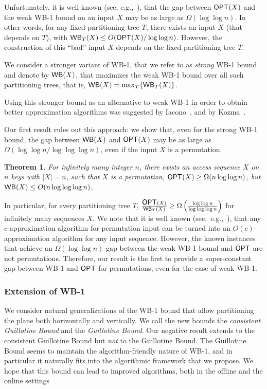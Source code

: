 \documentclass[11pt]{article}
\numberwithin{equation}{section}
\newtheorem{theorem}{Theorem}[section]
\theoremstyle{definition}
\theoremstyle{plain}
\begin{document}
Unfortunately, it is well-known (see, e.g.,~\cite{tango,multisplay,in_pursuit}), that the gap between $\mbox{\sf OPT}(X)$
and the weak WB-1 bound on an input $X$ may be as large as  $\Omega(\log\log n)$. 
In other words, for any fixed partitioning tree $T$, there exists an input $X$ (that depends on $T$),  with $\mathsf{WB}_{T}(X)\leq O(\mbox{\sf OPT}(X)/\log\log n)$.
However, the construction of this ``bad'' input $X$  depends on the fixed partitioning tree $T$. 


We consider a stronger variant of WB-1, that we refer to as \emph{strong} WB-1 bound and denote by $\mathsf{WB}(X)$, that maximizes the weak WB-1 bound over all such partitioning trees, that is, $\mathsf{WB}(X)=\max_{T}\{\mathsf{WB}_{T}(X)\}$. 


Using this stronger bound as an alternative to weak WB-1 in order to obtain better approximation algorithms was suggested by Iacono~\cite{in_pursuit}, and by Kozma~\cite{Kozma16_thesis}.



 
Our first result rules out this approach: we show that, even for the strong WB-1 bound, the gap between $\mathsf{WB}(X)$ and $\mbox{\sf OPT}(X)$ may be as large as $\Omega(\log\log n/\log\log\log n)$, even if the input $X$ is a permutation. 


%
%
\begin{theorem}
	\label{thm:intro_WB}
	For infinitely many integer $n$, there exists
	an access sequence $X$ on $n$ keys with $|X|=n$, such that $X$ is a permutation, $\mbox{\sf OPT}(X)\geq \Omega(n\log\log n)$, but $\mathsf{WB}(X)\leq O(n\log\log\log n)$.
\end{theorem}

In particular, for every partitioning tree $T$, $\frac{\mbox{\sf OPT}(X)}{\mathsf{WB}_{T}(X)}\geq \Omega\left(\frac{\log\log n}{\log\log\log n}\right )$ for infinitely many sequences $X$.
We note that it is well known  (see,~e.g.,~\cite{FOCS15}), that any $c$-approximation algorithm for permutation input can be turned into an $O(c)$-approximation algorithm for any input sequence. However, the known instances that achieve an $\Omega(\log\log n)$-gap between the weak WB-1 bound and $\mbox{\sf OPT}$ are not permutations. Therefore, our result is the first to provide a super-constant gap between WB-1 and $\mbox{\sf OPT}$ for permutations, even for the case of weak WB-1.



\subsubsection{Extension of WB-1}
\label{sec:extension-intro} 
We consider natural generalizations of the WB-1 bound that allow partitioning the plane both horizontally and vertically. We call the new bounds the \emph{consistent Guillotine Bound} and the \emph{Guillotine Bound}. 
Our negative result extends to the consistent Guillotine Bound but \emph{not} to the Guillotine Bound. The Guillotine Bound seems to maintain the  algorithm-friendly nature of WB-1, and in particular it naturally fits into the algorithmic framework that we propose. We hope that this bound can lead to improved algorithms, both in the offline and the online settings
\end{document}
